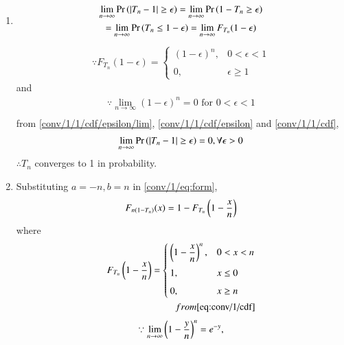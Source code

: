 %
\begin{enumerate}
\item 
\begin{multline}
    \displaystyle\lim_{n\to\infty}\Pr\left(|T_{n}-1|\geq\epsilon\right)=\displaystyle\lim_{n\to\infty}\Pr\left(1-T_{n}\geq\epsilon\right)\\
	=\displaystyle\lim_{n\to\infty}\Pr\left(T_{n}\leq1-\epsilon\right)=\displaystyle\lim_{n\to\infty}F_{T_{n}}(1-\epsilon)
	\label{conv/1/1/cdf}
\end{multline}
\begin{align}
    \because F_{T_{n}}(1-\epsilon)=\begin{cases}
	(1-\epsilon)^{n}, & 0< \epsilon<1 \\~\\[-1em]
	0, & \epsilon\geq 1
	\end{cases}
	\label{conv/1/1/cdf/epsilon}
\end{align}
and 
\begin{align}
	\label{conv/1/1/cdf/epsilon/lim}
    \because\displaystyle\lim_{n\to\infty}(1-\epsilon)^{n}=0 \text{ for } 0< \epsilon<1\\
\end{align}
%
from 	\eqref{conv/1/1/cdf/epsilon/lim}, 	\eqref{conv/1/1/cdf/epsilon} and 	\eqref{conv/1/1/cdf},
\begin{align}
	 \displaystyle\lim_{n\to\infty}\Pr\left(|T_{n}-1|\geq\epsilon\right)=0,\forall\epsilon>0
\end{align}
$\therefore T_{n}$ converges to 1 in probability.
\item 
Substituting $a=-n,b=n$ in \eqref{conv/1/eq:form},
\begin{align}
	F_{n(1-T_{n})}(x)=1-F_{T_{n}}\left(1-\dfrac{x}{n}\right)\\
\end{align}	
where
\begin{align}
    F_{T_{n}}\left(1-\dfrac{x}{n}\right)=\begin{cases}
	\left(1-\dfrac{x}{n}\right)^{n}, & 0< x<n \\~\\[-1em]
	1, & x\leq 0\\~\\[-1em]
	0, & x\geq n
	\end{cases} \\
	from  	\eqref{eq:conv/1/cdf}
\end{align}
\begin{align}
	\because\displaystyle\lim_{n\to\infty}\brak{1-\dfrac{y}{n}}^{n}=e^{-y}, \\

\end{align}
\end{enumerate}
